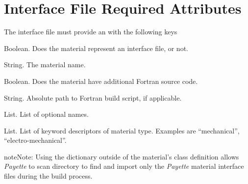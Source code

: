 \documentclass[letterpaper,10pt,english]{sphinxmanual}
\begin{document}
\section{Interface File Required Attributes}
\label{Files/installing_materials:interface-file-required-attributes}
The interface file must provide an  with the following keys


\begin{fulllineitems}
Boolean.  Does the material represent an interface file, or not.

\end{fulllineitems}



\begin{fulllineitems}
String.  The material name.

\end{fulllineitems}



\begin{fulllineitems}
Boolean.  Does the material have additional Fortran source code.

\end{fulllineitems}



\begin{fulllineitems}
String.  Absolute path to Fortran build script, if applicable.

\end{fulllineitems}



\begin{fulllineitems}
List.  List of optional names.

\end{fulllineitems}



\begin{fulllineitems}
List. List of keyword descriptors of material type. Examples are ``mechanical'',
``electro-mechanical''.

\end{fulllineitems}


\begin{notice}{note}{Note:}
Using the  dictionary outside of the material's class definition
allows \emph{Payette} to scan  directory to
find and import only the \emph{Payette} material interface files during the build
process.
\end{notice}
\end{document}
